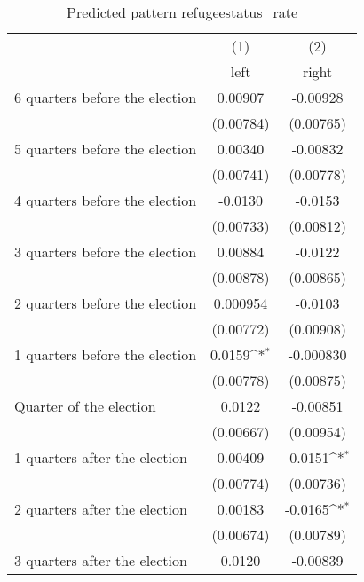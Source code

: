 \begin{table}[htbp]\centering
\def\sym#1{\ifmmode^{#1}\else\(^{#1}\)\fi}
\caption{Predicted pattern refugeestatus\_rate}
\begin{tabular}{l*{2}{c}}
\hline\hline
                    &\multicolumn{1}{c}{(1)}&\multicolumn{1}{c}{(2)}\\
                    &\multicolumn{1}{c}{left}&\multicolumn{1}{c}{right}\\
\hline
 6 quarters before the election&     0.00907         &    -0.00928         \\
                    &   (0.00784)         &   (0.00765)         \\
[1em]
 5 quarters before the election&     0.00340         &    -0.00832         \\
                    &   (0.00741)         &   (0.00778)         \\
[1em]
 4 quarters before the election&     -0.0130         &     -0.0153         \\
                    &   (0.00733)         &   (0.00812)         \\
[1em]
 3 quarters before the election&     0.00884         &     -0.0122         \\
                    &   (0.00878)         &   (0.00865)         \\
[1em]
 2 quarters before the election&    0.000954         &     -0.0103         \\
                    &   (0.00772)         &   (0.00908)         \\
[1em]
 1 quarters before the election&      0.0159\sym{*}  &   -0.000830         \\
                    &   (0.00778)         &   (0.00875)         \\
[1em]
Quarter of the election&      0.0122         &    -0.00851         \\
                    &   (0.00667)         &   (0.00954)         \\
[1em]
 1 quarters after the election&     0.00409         &     -0.0151\sym{*}  \\
                    &   (0.00774)         &   (0.00736)         \\
[1em]
 2 quarters after the election&     0.00183         &     -0.0165\sym{*}  \\
                    &   (0.00674)         &   (0.00789)         \\
[1em]
 3 quarters after the election&      0.0120         &    -0.00839         \\

\end{tabular}
\end{table}
